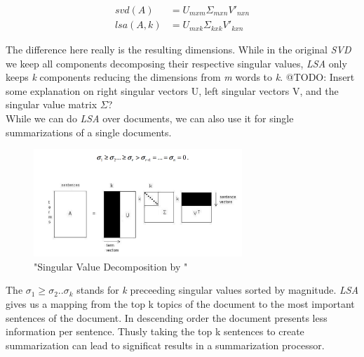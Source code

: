       \begin{align*}
        svd(A) &= U_{mxm}\Sigma_{mxn} V'_{nxn} \\
        lsa(A, k) &= U_{mxk}\Sigma_{kxk} V'_{kxn}
      \end{align*}

      The difference here really is the resulting dimensions. While in the original \emph{SVD} we keep all components decomposing their respective singular values, \emph{LSA} only keeps \emph{k} components reducing the dimensions from \emph{m} words to \emph{k}. @TODO: Insert some explanation on right singular vectors U, left singular vectors V, and the singular value matrix $\Sigma$?\\
      While we can do \emph{LSA} over documents, we can also use it for single summarizations of a single documents.

      \begin{figure}[h!]
        \centering
          \includegraphics[width=0.7\textwidth]{svd_lsa.png}
          \caption{"Singular Value Decomposition by \cite{SumLSASteinberger2004}"}
          \label{svd_lsa}
      \end{figure}

      The $\sigma_1 \geq \sigma_2..\sigma_k$ stands for \emph{k} preceeding singular values sorted by magnitude. \emph{LSA} gives us a mapping from the top k topics of the document to the most important sentences of the document. In descending order the document presents less information per sentence. Thusly taking the top k sentences to create summarization can lead to significat results in a summarization processor. \cite{SumLSASteinberger2004}\\

